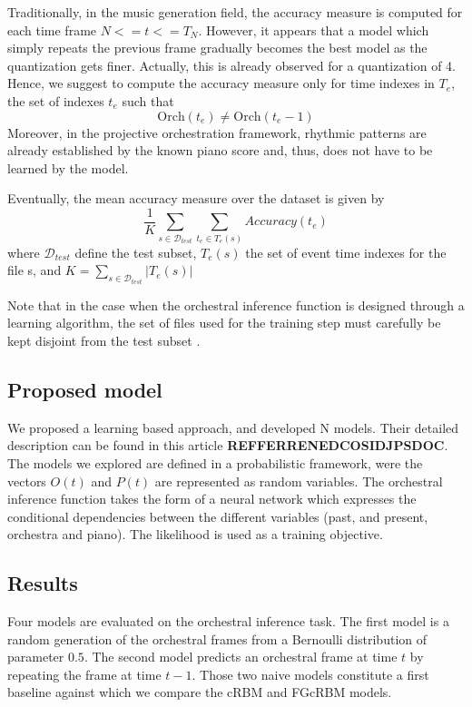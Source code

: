 \documentclass[twoside,twocolumn]{article}
\begin{document}
Traditionally, in the music generation field, the accuracy measure is computed for each time frame $N <= t <= T_{N}$. However, it appears that a model which simply repeats the previous frame gradually becomes the best model as the quantization gets finer. Actually, this is already observed for a quantization of 4.
Hence, we suggest to compute the accuracy measure only for time indexes in $T_e$, the set of indexes $t_e$ such that
\[\text{Orch}(t_{e}) \neq \text{Orch}(t_{e} - 1)\]
Moreover, in the projective orchestration framework, rhythmic patterns are already established by the known piano score and, thus, does not have to be learned by the model.

Eventually, the mean accuracy measure over the dataset is given by
\begin{equation}
\frac{1}{K} \sum_{s \in \mathcal{D}_{test}} \sum_{t_e \in T_e(s)} Accuracy(t_e)
\end{equation}
where $\mathcal{D}_{test}$ define the test subset, $T_{e}(s)$ the set of event time indexes for the file s, and $K = \sum_{s \in \mathcal{D}_{test}} |T_e(s)|$

Note that in the case when the orchestral inference function is designed through a learning algorithm, the set of files used for the training step must carefully be kept disjoint from the test subset \cite{bishop2006pattern}.

\subsection{Proposed model}
We proposed a learning based approach, and developed N models. Their detailed description can be found in this article \textbf{REFFERRENEDCOSIDJPSDOC}.
The models we explored are defined in a probabilistic framework, were the vectors $O(t)$ and $P(t)$ are represented as random variables. The orchestral inference function takes the form of a neural network which expresses the conditional dependencies between the different variables (past, and present, orchestra and piano). The likelihood is used as a training objective.

\subsection{Results}
Four models are evaluated on the orchestral inference task. The first model is a random generation of the orchestral frames from a Bernoulli distribution of parameter $0.5$. The second model predicts an orchestral frame at time $t$ by repeating the frame at time $t-1$. Those two naive models constitute a first baseline against which we compare the cRBM and FGcRBM models.
\end{document}
